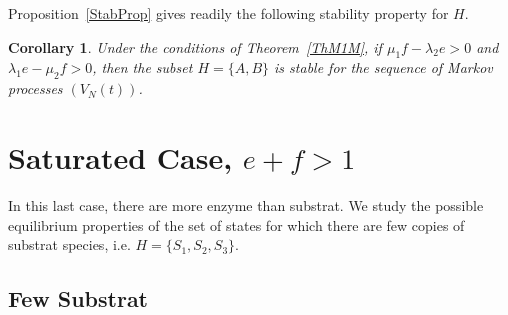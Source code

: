 \documentclass[english]{amsart}
\newtheorem{corollary}[proposition]{Corollary}
\numberwithin{proposition}{section}
\begin{document}
Proposition~\ref{StabProp} gives readily the following stability property for $H$.
\begin{corollary}
Under the conditions of Theorem~\ref{ThM1M}, if $\mu_1f{-}\lambda_2e{>}0$ and $\lambda_1e{-}\mu_2f{>}0$, then the subset $H{=}\{{ A}, { B}\}$ is stable for the sequence of Markov processes $(V_N(t))$. 
\end{corollary}
\section{Saturated Case, $e{+}f{>}1$}\label{SatSec}
In this last case, there are more enzyme than substrat. We study the possible equilibrium properties of the set of states for which there are few copies of substrat species, i.e. $H{=}\{{ S}_1,{ S}_2,{ S}_3\}$. 
\subsection{Few Substrat}
\end{document}
